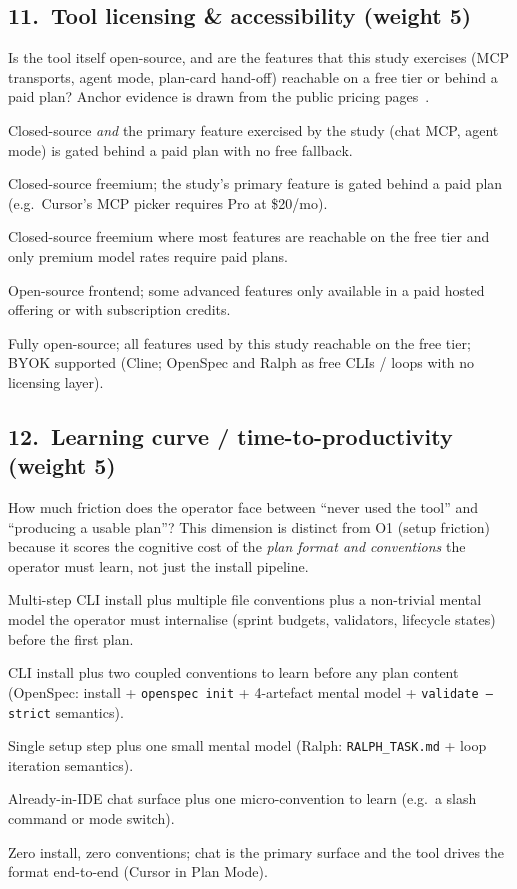 \subsection*{11.\ Tool licensing \& accessibility (weight 5)}
Is the tool itself open-source, and are the features that this study
exercises (MCP transports, agent mode, plan-card hand-off) reachable on
a free tier or behind a paid plan? Anchor evidence is drawn from the
public pricing pages~\citep{cline2026pricing,cursor2026pricing}.
\begin{description}[leftmargin=11mm, labelindent=0mm]
\item[1] Closed-source \emph{and} the primary feature exercised by the
study (chat MCP, agent mode) is gated behind a paid plan with no free
fallback.
\item[2] Closed-source freemium; the study's primary feature is gated
behind a paid plan (e.g.\ Cursor's MCP picker requires Pro at \$20/mo).
\item[3] Closed-source freemium where most features are reachable on
the free tier and only premium model rates require paid plans.
\item[4] Open-source frontend; some advanced features only available in
a paid hosted offering or with subscription credits.
\item[5] Fully open-source; all features used by this study reachable
on the free tier; BYOK supported (Cline; OpenSpec and Ralph as
free CLIs / loops with no licensing layer).
\end{description}

\subsection*{12.\ Learning curve / time-to-productivity (weight 5)}
How much friction does the operator face between ``never used the
tool'' and ``producing a usable plan''? This dimension is distinct
from O1 (setup friction) because it scores the cognitive cost of the
\emph{plan format and conventions} the operator must learn, not just
the install pipeline.
\begin{description}[leftmargin=11mm, labelindent=0mm]
\item[1] Multi-step CLI install plus multiple file conventions plus a
non-trivial mental model the operator must internalise (sprint
budgets, validators, lifecycle states) before the first plan.
\item[2] CLI install plus two coupled conventions to learn before any
plan content (OpenSpec: install + \texttt{openspec init} +
4-artefact mental model + \texttt{validate --strict} semantics).
\item[3] Single setup step plus one small mental model (Ralph:
\texttt{RALPH\_TASK.md} + loop iteration semantics).
\item[4] Already-in-IDE chat surface plus one micro-convention to
learn (e.g.\ a slash command or mode switch).
\item[5] Zero install, zero conventions; chat is the primary surface
and the tool drives the format end-to-end (Cursor in Plan Mode).
\end{description}

